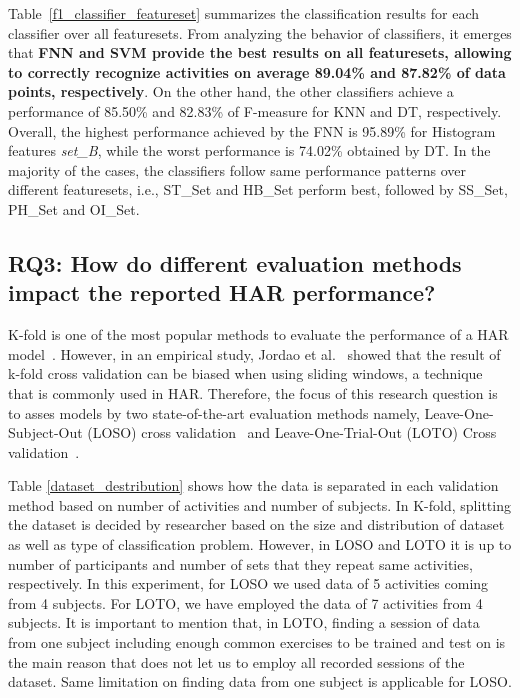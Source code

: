 \documentclass[journal,article,submit,moreauthors,pdftex]{Definitions/mdpi}
\begin{document}
Table~\ref{f1_classifier_featureset} summarizes the classification results for each classifier over all featuresets.  From analyzing the behavior of classifiers, it emerges that \textbf{FNN and SVM provide the best results on all featuresets, allowing to correctly recognize activities on average 89.04\% and 87.82\% of data points, respectively}. On the other hand, the other classifiers achieve a performance of 85.50\% and 82.83\% of F-measure for KNN and DT, respectively. Overall, the highest performance achieved by the FNN is 95.89\% for Histogram features \textit{set\_B}, while the worst performance is 74.02\% obtained by DT. In the majority of the cases, the classifiers follow same performance patterns over different featuresets, i.e., ST\_Set and HB\_Set perform best, followed by SS\_Set, PH\_Set and OI\_Set. 


\subsection{RQ3: How do different evaluation methods impact the reported HAR performance?}

K-fold is one of the most popular methods to evaluate the performance of a HAR model~\cite{wang2019survey}. However, in an empirical study, Jordao et al.~\cite{jordao2018human} showed that the result of k-fold cross validation can be biased when using sliding windows, a technique that is commonly used in HAR. Therefore, the focus of this research question is to asses models by two state-of-the-art evaluation methods namely, Leave-One-Subject-Out (LOSO) cross validation~\cite{liu2011multisensor} and Leave-One-Trial-Out (LOTO) Cross validation~\cite{sena2018multiscale,jordao2018human}. 

Table \ref{dataset_destribution} shows how the data is separated in each validation method based on number of activities and number of subjects. In K-fold, splitting the dataset is decided by researcher based on the size and distribution of dataset as well as type of classification problem\cite{jordao2018human}. However, in LOSO and LOTO it is up to number of participants and number of sets that they repeat same activities, respectively. In this experiment, for LOSO we used data of 5 activities coming from 4 subjects. For LOTO, we have employed the data of 7 activities from 4 subjects. It is important to mention that, in LOTO, finding a session of data from one subject including enough common exercises to be trained and test on is the main reason that does not let us to employ all recorded sessions of the dataset. Same limitation on finding data from one subject is applicable for LOSO.
\end{document}
